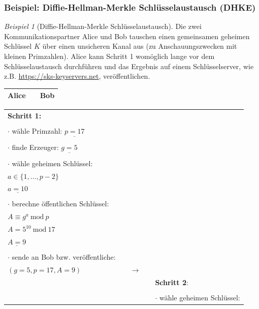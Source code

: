 \documentclass[
  a4paper,
  11pt,
]{scrartcl}
\theoremstyle{plain}
\theoremstyle{definition}
\theoremstyle{remark}
\newtheorem{beispiel}{Beispiel}
\newcommand{\Mod}[1]{\ \mathrm{mod}\ #1}
\begin{document}
\subsubsection{Beispiel: Diffie-Hellman-Merkle Schlüsselaustausch (DHKE)}
\label{sub:dhke_beispiel}
\begin{beispiel}[Diffie-Hellman-Merkle Schlüsselaustausch]\label{bsp:dhke}
  Die zwei Kommunikationspartner Alice und Bob tauschen einen gemeinsamen
  geheimen Schlüssel $K$ über einen unsicheren Kanal aus (zu Anschauungszwecken
  mit kleinen Primzahlen). Alice kann Schritt 1 womöglich lange vor dem 
  Schlüsselaustausch durchführen und das Ergebnis auf einem Schlüsselserver, 
  wie z.B. \url{https://sks-keyservers.net}, veröffentlichen.
  \begin{center}
    \begin{tabularx}{\textwidth}{lXr}
      \textbf{Alice} & & \textbf{Bob}\\
      \midrule
    \end{tabularx}
    \begin{tabularx}{\textwidth}{lXcXl}
      \textbf{Schritt 1:} & & & & \\
      & & & & \\
      $\cdot$ wähle Primzahl: $\underline{p = 17}$ & & & & \\
      & & & & \\
      $\cdot$ finde Erzeuger: $\underline{g = 5}$ & & & & \\
      & & & & \\
      $\cdot$ wähle geheimen Schlüssel: & & & & \\
      $a \in \{1, \dots, p-2\}$ & & & & \\
      $\underline{a = 10}$ & & & & \\
      & & & & \\
      $\cdot$ berechne öffentlichen Schlüssel: & & & & \\
      $A \equiv g^a \Mod{p}$ & & & & \\
      $A = 5^{10} \Mod{17}$ & & & & \\
      $\underline{A = 9}$ & & & & \\
      & & & & \\
      $\cdot$ sende an Bob bzw. veröffentliche: & & & & \\
      $(g = 5, p = 17, A = 9)$ & & $\to$ & & \\\midrule
      & & & & \textbf{Schritt 2}:\\
      & & & & \\
      & & & & $\cdot$ wähle geheimen Schlüssel:\\

\end{tabularx}
\end{center}
\end{beispiel}
\end{document}
